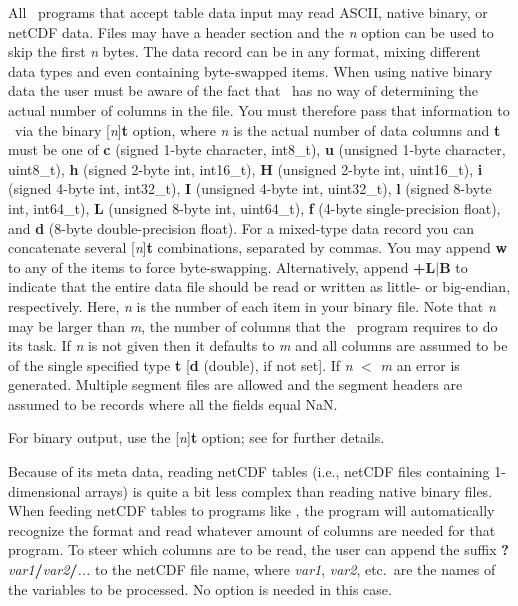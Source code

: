All \GMT\ programs that accept table data input may read ASCII,
native binary, or netCDF data.  Files may have a header section
and the \emph{n} option can be used to skip the first
\emph{n} bytes.  The data record can be in any format, mixing
different data types and even containing byte-swapped items.  When
using native binary data the user must be aware of the fact that
\GMT\ has no way of determining the actual number of columns in
the file.  You must therefore pass that information to \GMT\ via
the binary [\emph{n}]\textbf{t} option, where \emph{n} is
the actual number of data columns and \textbf{t} must be one of
\textbf{c} (signed 1-byte character, int8\_t), \textbf{u} (unsigned
1-byte character, uint8\_t), \textbf{h} (signed 2-byte int,
int16\_t), \textbf{H} (unsigned 2-byte int, uint16\_t), \textbf{i}
(signed 4-byte int, int32\_t), \textbf{I} (unsigned 4-byte int,
uint32\_t), \textbf{l} (signed 8-byte int, int64\_t), \textbf{L}
(unsigned 8-byte int, uint64\_t), \textbf{f} (4-byte
single-precision float), and \textbf{d} (8-byte double-precision
float).  For a mixed-type data record you can concatenate several
[\emph{n}]\textbf{t} combinations, separated by commas.  You may
append \textbf{w} to any of the items to force byte-swapping.
Alternatively, append \textbf{+L}$|$\textbf{B} to indicate that
the entire data file should be read or written as little- or
big-endian, respectively.  Here, \emph{n} is the number of each
item in your binary file.  Note that \emph{n} may be larger than
\emph{m}, the number of columns that the \GMT\ program requires to
do its task.  If \emph{n} is not given then it defaults to
\emph{m} and all columns are assumed to be of the single specified
type \textbf{t} [\textbf{d} (double), if not set].  If \emph{n}
$<$ \emph{m} an error is generated.  Multiple segment files are
allowed and the segment headers are assumed to be records where
all the fields equal NaN.

For binary output, use the [\emph{n}]\textbf{t} option;
see  for further details.

Because of its meta data, reading netCDF tables (i.e., netCDF
files containing 1-dimensional arrays) is quite a bit less complex
than reading native binary files. When feeding netCDF tables to
programs like , the program will automatically
recognize the format and read whatever amount of columns are
needed for that program. To steer which columns are to be read,
the user can append the suffix
\textbf{?}\emph{var1}\textbf{/}\emph{var2}\textbf{/}\emph{...} to
the netCDF file name, where \emph{var1}, \emph{var2}, etc.\ are
the names of the variables to be processed. No  option is
needed in this case.

